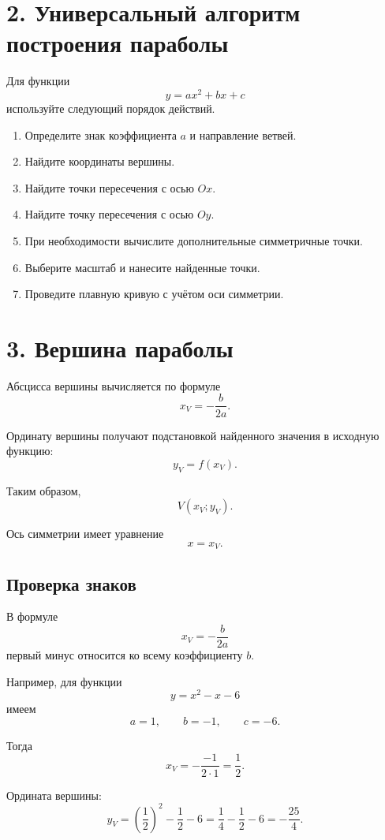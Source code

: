 \documentclass[a4paper,12pt]{article}
\begin{document}
\section*{2. Универсальный алгоритм построения параболы}

Для функции
\[
  y=ax^2+bx+c
\]
используйте следующий порядок действий.

\begin{enumerate}[label=\textcolor{darkaccent}{\textbf{\arabic*.}}]
  \item Определите знак коэффициента \(a\) и направление ветвей.
  \item Найдите координаты вершины.
  \item Найдите точки пересечения с осью \(Ox\).
  \item Найдите точку пересечения с осью \(Oy\).
  \item При необходимости вычислите дополнительные симметричные точки.
  \item Выберите масштаб и нанесите найденные точки.
  \item Проведите плавную кривую с учётом оси симметрии.
\end{enumerate}

\section*{3. Вершина параболы}

Абсцисса вершины вычисляется по формуле
\[
  \boxed{x_V=-\frac{b}{2a}}.
\]

Ординату вершины получают подстановкой найденного значения в исходную функцию:
\[
  \boxed{y_V=f(x_V)}.
\]

Таким образом,
\[
  V(x_V;y_V).
\]

Ось симметрии имеет уравнение
\[
  \boxed{x=x_V}.
\]

\subsection*{Проверка знаков}

В формуле
\[
  x_V=-\frac{b}{2a}
\]
первый минус относится ко всему коэффициенту \(b\).

Например, для функции
\[
  y=x^2-x-6
\]
имеем
\[
  a=1,\qquad b=-1,\qquad c=-6.
\]

Тогда
\[
  x_V=-\frac{-1}{2\cdot 1}=\frac12.
\]

Ордината вершины:
\[
  y_V=
  \left(\frac12\right)^2
  -\frac12-6
  =
  \frac14-\frac12-6
  =
  -\frac{25}{4}.
\]
\end{document}
